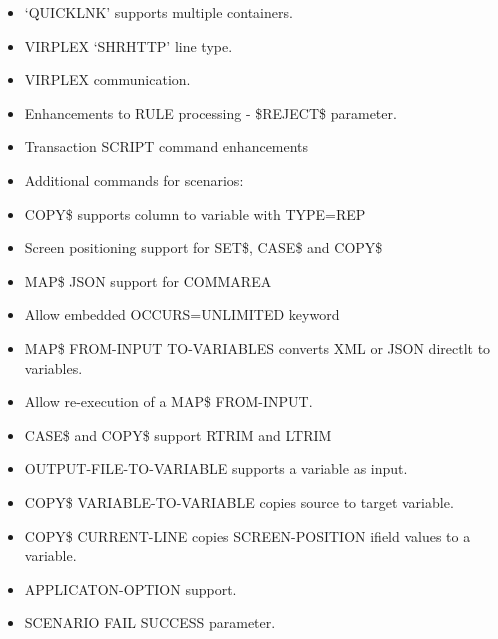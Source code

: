 \documentclass[letterpaper,10pt,english]{sphinxmanual}
\begin{document}
\begin{itemize}
\item {} 
‘QUICKLNK’ supports multiple containers.

\item {} 
VIRPLEX ‘SHRHTTP’ line type.

\item {} 
VIRPLEX communication.

\item {} 
Enhancements to RULE processing - \$REJECT\$ parameter.

\item {} 
Transaction SCRIPT command enhancements

\item {} 
Additional commands for scenarios:

\item {} 
COPY\$ supports column to variable with TYPE=REP

\item {} 
Screen positioning support for SET\$, CASE\$ and COPY\$

\item {} 
MAP\$ JSON support for COMMAREA

\item {} 
Allow embedded OCCURS=UNLIMITED keyword

\item {} 
MAP\$ FROM-INPUT TO-VARIABLES converts XML or JSON directlt to variables.

\item {} 
Allow re-execution of a MAP\$ FROM-INPUT.

\item {} 
CASE\$ and COPY\$ support RTRIM and LTRIM

\item {} 
OUTPUT-FILE-TO-VARIABLE supports a variable as input.

\item {} 
COPY\$ VARIABLE-TO-VARIABLE copies source to target variable.

\item {} 
COPY\$ CURRENT-LINE copies SCREEN-POSITION ifield values to a variable.

\item {} 
APPLICATON-OPTION support.

\item {} 
SCENARIO FAIL \textbar{} SUCCESS parameter.

\end{itemize}
\end{document}
